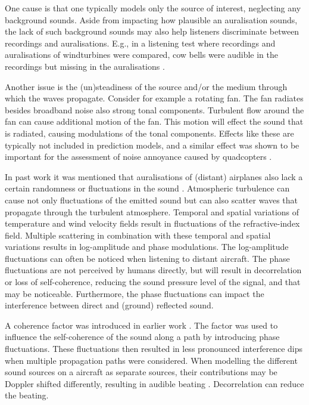 One cause is that one typically models only the source of interest, neglecting
any background sounds. Aside from impacting how plausible an auralisation
sounds, the lack of such background sounds may also help listeners discriminate
between recordings and auralisations. E.g., in a listening test where recordings
and auralisations of windturbines were compared, cow bells were audible in the
recordings but missing in the auralisations \cite{Pieren2014}.

Another issue is the (un)steadiness of the source and/or
the medium through which the waves propagate. Consider for example a
rotating fan. The fan radiates besides broadband noise also strong tonal
components. Turbulent flow around the fan can cause additional motion of the
fan. This motion will effect the sound that is radiated, causing
modulations of the tonal components. Effects like these are typically not
included in prediction models, and a similar effect was shown to be
important for the assessment of noise annoyance caused by quadcopters
\cite{Rizzi2015}.

In past work it was mentioned that auralisations of (distant) airplanes also
lack a certain randomness or fluctuations in the sound \cite{Arntzen2014a}.
Atmospheric turbulence can cause not only fluctuations of the emitted sound but
can also scatter waves that propagate through the turbulent atmosphere. Temporal
and spatial variations of temperature and wind velocity fields result in
fluctuations of the refractive-index field. Multiple scattering in combination
with these temporal and spatial variations results in log-amplitude and phase
modulations. The log-amplitude fluctuations can often be noticed when listening
to distant aircraft. The phase fluctuations are not perceived by humans
directly, but will result in decorrelation or loss of self-coherence, reducing
the sound pressure level of the signal, and that may be noticeable. Furthermore,
the phase fluctuations can impact the interference between direct and (ground)
reflected sound.

A coherence factor was introduced in earlier work \cite{Shin2006, Arntzen2014b,
Arntzen2014a}. The factor was used to influence the self-coherence of the sound
along a path by introducing phase fluctuations. These fluctuations then resulted
in less pronounced interference dips when multiple propagation paths were
considered. When modelling the different sound sources on a aircraft as separate
sources, their contributions may be Doppler shifted differently, resulting in
audible beating \cite{Rizzi2013}. Decorrelation can reduce the beating.

